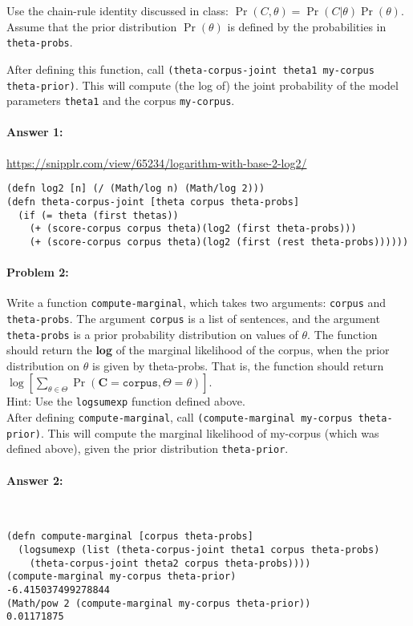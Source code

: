 \documentclass[12pt, letterpaper]{article}
\begin{document}
Use the chain-rule identity discussed in class:
$\Pr(C,\theta) = \Pr(C|\theta)\Pr(\theta)$. Assume that the prior
distribution $\Pr(\theta)$ is defined by the probabilities in
\texttt{theta-probs}.

After defining this function, call \texttt{(theta-corpus-joint theta1 my-corpus theta-prior)}. This will compute (the log of) the joint
probability of the model parameters \texttt{theta1} and the corpus
\texttt{my-corpus}.

\paragraph{Answer 1:}
\url{https://snipplr.com/view/65234/logarithm-with-base-2-log2/}\begin{lstlisting}
(defn log2 [n] (/ (Math/log n) (Math/log 2)))
(defn theta-corpus-joint [theta corpus theta-probs]
  (if (= theta (first thetas))
    (+ (score-corpus corpus theta)(log2 (first theta-probs)))
    (+ (score-corpus corpus theta)(log2 (first (rest theta-probs))))))
\end{lstlisting}

\hrulefill
\paragraph{Problem 2:}

Write a function \texttt{compute-marginal}, which takes two arguments:
\texttt{corpus} and \texttt{theta-probs}. The argument \texttt{corpus}
is a list of sentences, and the argument \texttt{theta-probs} is a
prior probability distribution on values of $\theta$. The function
should return the \textbf{log} of the marginal likelihood of the
corpus, when the prior distribution on $\theta$ is given by
theta-probs. That is, the function should return
$\log[\sum_{\theta \in \Theta} \Pr(\mathbf{C}=\texttt{corpus}, \Theta=\theta)]$.
\\

\noindent Hint: Use the \texttt{logsumexp} function defined above.
\\

\noindent After defining \texttt{compute-marginal}, call
\texttt{(compute-marginal my-corpus theta-prior)}. This will compute
the marginal likelihood of my-corpus (which was defined above), given
the prior distribution \texttt{theta-prior}.

\paragraph{Answer 2:}~\begin{lstlisting}
(defn compute-marginal [corpus theta-probs]
  (logsumexp (list (theta-corpus-joint theta1 corpus theta-probs)
    (theta-corpus-joint theta2 corpus theta-probs))))
(compute-marginal my-corpus theta-prior)
-6.415037499278844
(Math/pow 2 (compute-marginal my-corpus theta-prior))
0.01171875
\end{lstlisting}
\end{document}

